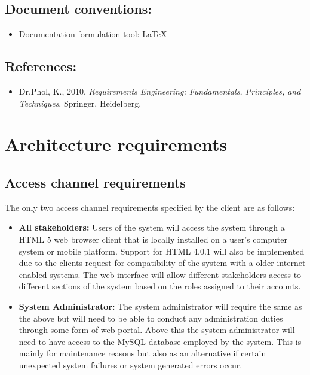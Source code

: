 \documentclass[12pt]{article}
\begin{document}
\vspace{0.5in}

\subsection{Document conventions:}
\vspace{0.1in}
\begin{itemize}
\item Documentation formulation tool: LaTeX

\end{itemize}

\vspace{0.2in}

\subsection{References:}
\vspace{0.1in}
\begin{itemize}
\item Dr.Phol, K., 2010, \textit{Requirements Engineering: Fundamentals, Principles, and Techniques}, Springer, Heidelberg.
\end{itemize}	

\vspace{0.5in}

\newpage
\section{Architecture requirements}
\subsection{Access channel requirements}
\vspace{0.2in}
The only two access channel requirements specified by the client are as follows:
\begin{itemize}


\item \textbf{All stakeholders:}
Users of the system will access the system through a HTML 5 web browser client that is locally installed on a user's computer system or mobile platform. Support for HTML 4.0.1 will also be implemented due to the clients request for compatibility of the system with a older internet enabled systems. The web interface will allow different stakeholders access to different sections of the system based on the roles assigned to their accounts. 

\item\textbf{System Administrator:}
The system administrator will require the same as the above but will need to be able to conduct any administration duties through some form of web portal. Above this the system administrator will need to have access to the MySQL database employed by the system. This is mainly for maintenance reasons but also as an alternative if certain unexpected system failures or system generated errors occur.

\end{itemize}
\vspace{0.2in}
\end{document}
